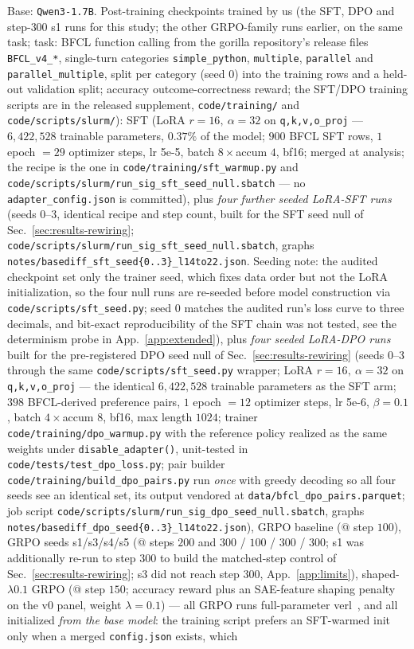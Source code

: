 \documentclass{article}
\begin{document}
Base: \texttt{Qwen3-1.7B}. Post-training checkpoints trained by us (the SFT, DPO and step-$300$ s1 runs for this study; the other GRPO-family runs earlier, on the same task; task: BFCL function calling from the gorilla repository's release files \texttt{BFCL\_v4\_*}, single-turn categories \texttt{simple\_python}, \texttt{multiple}, \texttt{parallel} and \texttt{parallel\_multiple}, split per category (seed $0$) into the training rows and a held-out validation split; accuracy outcome-correctness reward; the SFT/DPO training scripts are in the released supplement, \texttt{code/training/} and \texttt{code/scripts/slurm/}): SFT (LoRA $r{=}16,\ \alpha{=}32$ on \texttt{q,k,v,o\_proj} --- $6{,}422{,}528$ trainable parameters, $0.37\%$ of the model; $900$ BFCL SFT rows, $1$ epoch $=29$ optimizer steps, lr 5e-5, batch $8\times$accum $4$, bf16; merged at analysis; the recipe is the one in \texttt{code/training/sft\_warmup.py} and \texttt{code/scripts/slurm/run\_sig\_sft\_seed\_null.sbatch} --- no \texttt{adapter\_config.json} is committed), plus \emph{four further seeded LoRA-SFT runs} (seeds $0$--$3$, identical recipe and step count, built for the SFT seed null of Sec.~\ref{sec:results-rewiring}; \texttt{code/scripts/slurm/run\_sig\_sft\_seed\_null.sbatch}, graphs \texttt{notes/basediff\_sft\_seed\{0..3\}\_l14to22.json}. Seeding note: the audited checkpoint set only the trainer seed, which fixes data order but not the LoRA initialization, so the four null runs are re-seeded before model construction via \texttt{code/scripts/sft\_seed.py}; seed $0$ matches the audited run's loss curve to three decimals, and bit-exact reproducibility of the SFT chain was not tested, see the determinism probe in App.~\ref{app:extended}), plus \emph{four seeded LoRA-DPO runs} built for the pre-registered DPO seed null of Sec.~\ref{sec:results-rewiring} (seeds $0$--$3$ through the same \texttt{code/scripts/sft\_seed.py} wrapper; LoRA $r{=}16,\ \alpha{=}32$ on \texttt{q,k,v,o\_proj} --- the identical $6{,}422{,}528$ trainable parameters as the SFT arm; $398$ BFCL-derived preference pairs, $1$ epoch $=12$ optimizer steps, lr 5e-6, $\beta{=}0.1$, batch $4\times$accum $8$, bf16, max length $1024$; trainer \texttt{code/training/dpo\_warmup.py} with the reference policy realized as the same weights under \texttt{disable\_adapter()}, unit-tested in \texttt{code/tests/test\_dpo\_loss.py}; pair builder \texttt{code/training/build\_dpo\_pairs.py} run \emph{once} with greedy decoding so all four seeds see an identical set, its output vendored at \texttt{data/bfcl\_dpo\_pairs.parquet}; job script \texttt{code/scripts/slurm/run\_sig\_dpo\_seed\_null.sbatch}, graphs \texttt{notes/basediff\_dpo\_seed\{0..3\}\_l14to22.json}), GRPO baseline (@ step $100$), GRPO seeds s1/s3/s4/s5 (@ steps $200$ and $300$ / $100$ / $300$ / $300$; s1 was additionally re-run to step $300$ to build the matched-step control of Sec.~\ref{sec:results-rewiring}; s3 did not reach step $300$, App.~\ref{app:limits}), shaped-$\lambda0.1$ GRPO (@ step $150$; accuracy reward plus an SAE-feature shaping penalty on the v0 panel, weight $\lambda{=}0.1$) --- all GRPO runs full-parameter verl~\citep{verl2024}, and all initialized \emph{from the base model}: the training script prefers an SFT-warmed init only when a merged \texttt{config.json} exists, which 
\end{document}
